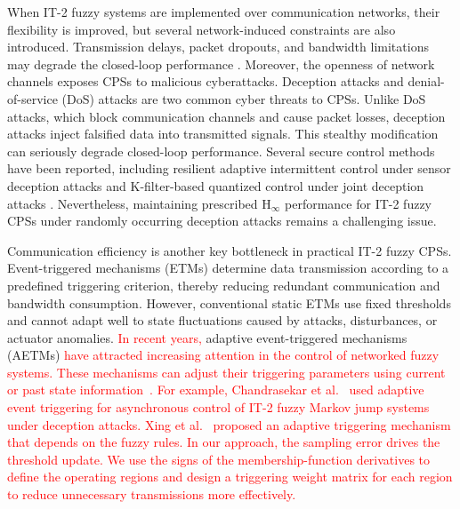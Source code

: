 \documentclass[preprint,review,fleqn,sort&compress,3p]{elsarticle}
\theoremstyle{definition} %
\theoremstyle{definition}%
\begin{document}
	When IT-2 fuzzy systems are implemented over communication networks, their
	flexibility is improved, but several network-induced constraints are also
	introduced. Transmission delays, packet dropouts, and bandwidth limitations may
	degrade the closed-loop performance \cite{zhangNetworkedControlSystems2020,pangNetworkedPredictiveControl2026}.
	Moreover, the openness of network channels exposes CPSs to malicious cyberattacks.
	Deception attacks
	\cite{yaoSecureControlMarkovian2023c,lianSwitchingLikeEventTriggeredControl2021}
	and denial-of-service (DoS) attacks
	\cite{zhaDynamicEventTriggeredOutput2022, buEventTriggeredDataDrivenControl2023}
	are two common cyber threats to CPSs. Unlike DoS attacks, which block communication
	channels and cause packet losses, deception attacks inject falsified data into
	transmitted signals. This stealthy modification can seriously degrade closed-loop
	performance. Several secure control methods have been
	reported, including resilient adaptive intermittent control under sensor deception
	attacks \cite{wangResilientAdaptiveIntermittent2024} and K-filter-based quantized
	control under joint deception attacks \cite{wangResilientAdaptiveStabilization2025}.
	Nevertheless, maintaining prescribed $\mathrm{H}_\infty$ performance for IT-2 fuzzy
	CPSs under randomly occurring deception attacks remains a challenging issue.
	
	Communication efficiency is another key bottleneck in practical IT-2 fuzzy CPSs.
	Event-triggered mechanisms (ETMs)
	\cite{postoyanFrameworkEventTriggeredStabilization2015,chenFinitetimeStabilityNonlinear2026}
	determine data transmission according to a predefined triggering criterion, thereby reducing redundant communication and bandwidth consumption.
	However, conventional static ETMs use fixed
	thresholds and cannot adapt well to state fluctuations caused by attacks,
	disturbances, or actuator anomalies. \textcolor{red}{In recent years,} adaptive event-triggered mechanisms (AETMs) \textcolor{red}{have attracted increasing attention in the control of networked fuzzy systems. These mechanisms can adjust their triggering parameters using current or past state information~\textcolor{black}{\cite{yangAdaptiveEventTriggeredSecure2025a}}. For example, Chandrasekar et al.~\textcolor{black}{\cite{chandrasekarAdaptiveEventTriggering2026}} used adaptive event triggering for asynchronous control of IT-2 fuzzy Markov jump systems under deception attacks. Xing et al.~\textcolor{black}{\cite{xingSwitchedFuzzyControl2024}} proposed an adaptive triggering mechanism that depends on the fuzzy rules. In our approach, the sampling error drives the threshold update. We use the signs of the membership-function derivatives to define the operating regions and design a triggering weight matrix for each region to reduce unnecessary transmissions more effectively.}
	
\end{document}
